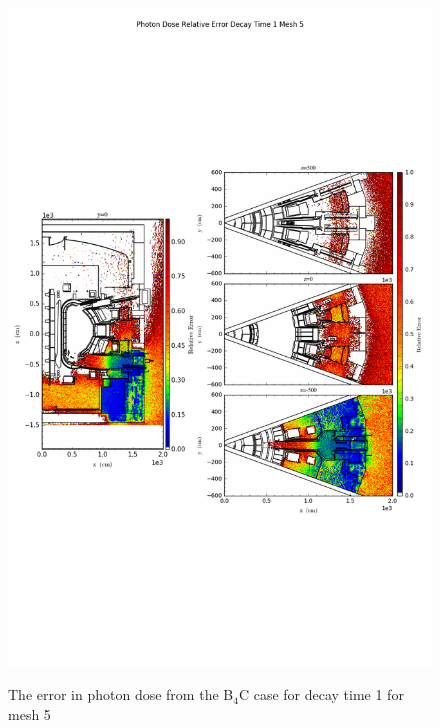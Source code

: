 \begin{figure}[ht!]
\centering
\includegraphics[trim={0cm 9cm 0cm 10cm},clip,scale=0.75]{../plots/final_model_nob4c/Photon_Dose_Relative_Error_Decay_Time_1_Mesh_5.png}
\label{fig:photons_dc1_no4bc_m5_error}
\caption{The error in photon dose from the B$_4$C case for decay time 1 for mesh 5}
\end{figure}
